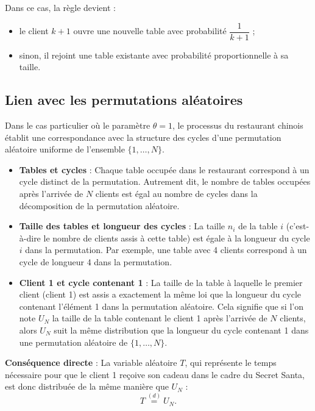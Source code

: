 \documentclass[12pt, a4paper]{article}
\theoremstyle{definition}
\theoremstyle{plain}
\begin{document}
Dans ce cas, la règle devient :
\begin{itemize}
  \item le client $k+1$ ouvre une nouvelle table avec probabilité $\dfrac{1}{k+1}$ ;
  \item sinon, il rejoint une table existante avec probabilité proportionnelle à sa taille.
\end{itemize}
\subsection{Lien avec les permutations aléatoires}

Dans le cas particulier où le paramètre $\theta = 1$, le processus du restaurant chinois établit une correspondance avec la structure des cycles d'une permutation aléatoire uniforme de l'ensemble $\{1, \dots, N\}$.

\begin{itemize}
    \item \textbf{Tables et cycles} : Chaque table occupée dans le restaurant correspond à un cycle distinct de la permutation. Autrement dit, le nombre de tables occupées après l'arrivée de $N$ clients est égal au nombre de cycles dans la décomposition de la permutation aléatoire.

    \item \textbf{Taille des tables et longueur des cycles} : La taille $n_i$ de la table $i$ (c'est-à-dire le nombre de clients assis à cette table) est égale à la longueur du cycle $i$ dans la permutation. Par exemple, une table avec 4 clients correspond à un cycle de longueur 4 dans la permutation.

    \item \textbf{Client 1 et cycle contenant 1} : La taille de la table à laquelle le premier client (client 1) est assis a exactement la même loi que la longueur du cycle contenant l'élément 1 dans la permutation aléatoire. Cela signifie que si l'on note $U_N$ la taille de la table contenant le client 1 après l'arrivée de $N$ clients, alors $U_N$ suit la même distribution que la longueur du cycle contenant 1 dans une permutation aléatoire de $\{1, \dots, N\}$.
\end{itemize}



\textbf{Conséquence directe} :
La variable aléatoire $T$, qui représente le temps nécessaire pour que le client 1 reçoive son cadeau dans le cadre du Secret Santa, est donc distribuée de la même manière que $U_N$ :
\[
T \overset{(d)}{=} U_N.
\]
\end{document}
